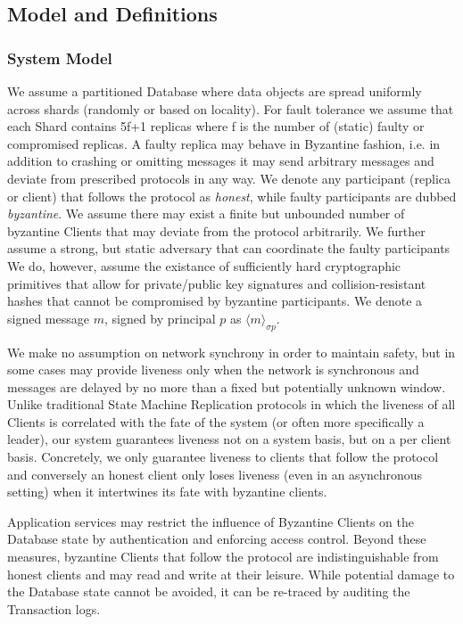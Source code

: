 \subsection{Model and Definitions}

\subsubsection{System Model}
We assume a partitioned Database where data objects are spread uniformly across shards (randomly or based on locality). For fault tolerance we assume that each Shard contains 5f+1 replicas where f is the number of (static) faulty or compromised replicas. A faulty replica may behave in Byzantine fashion, i.e. in addition to crashing or omitting messages it may send arbitrary messages and deviate from prescribed protocols in any way.
We denote any participant (replica or client) that follows the protocol as \textit{honest}, while faulty participants are dubbed \textit{byzantine}. We assume there may exist a finite but unbounded number of byzantine Clients that may deviate from the protocol arbitrarily. 
 We further assume a strong, but static adversary that can coordinate the faulty participants 
 We do, however, assume the existance of sufficiently hard cryptographic primitives that allow for private/public key signatures and collision-resistant hashes that cannot be compromised by byzantine participants. We denote a signed message $m$, signed by principal $p$ as $\langle m \rangle_{\sigma p}$.
 
We make no assumption on network synchrony in order to maintain safety, but in some cases may provide liveness  only when the network is synchronous and messages are delayed by no more than a fixed but potentially unknown window. Unlike traditional State Machine Replication protocols in which the liveness of all Clients is correlated with the fate of the system (or often more specifically a leader), our system guarantees liveness not on a system basis, but on a per client basis. Concretely, we only guarantee liveness to clients that follow the protocol and conversely an honest client only loses liveness (even in an asynchronous setting) when it intertwines its fate with byzantine clients.

Application services may restrict the influence of Byzantine Clients on the Database state by authentication and enforcing access control. Beyond these measures, byzantine Clients that follow the protocol are indistinguishable from honest clients and may read and write at their leisure. While potential damage to the Database state cannot be avoided, it can be re-traced by auditing the Transaction logs.
 
